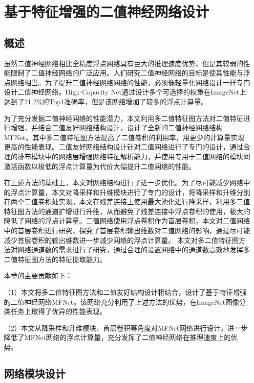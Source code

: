 
\chapter{基于特征增强的二值神经网络设计}

\section{概述}

虽然二值神经网络相比全精度浮点网络具有巨大的推理速度优势，但是其较弱的性能限制了二值神经网络的广泛应用。人们研究二值神经网络的目标是使其性能与浮点网络相当。为了提升二值神经网络网络的性能，必须像轻量化网络设计一样专门设计二值神经网络。High-Capacity Net\cite{expert}通过设计多个可选择的权重在ImageNet上达到了71.2\%的Top1准确率，但是该网络增加了较多的浮点计算量。

为了充分发掘二值神经网络的性能潜力，本文利用多二值特征图方法对二值特征进行增强，并结合二值友好网络结构设计，设计了全新的二值神经网络结构MFNet。其中多二值特征图方法提高了二值卷积的利用率，用更少的计算量实现更高的性能表现。二值友好网络结构设计针对二值网络进行了专门的设计，通过合理的排布模块中的网络层增强网络特征解析能力，并使用专用于二值网络的模块间激活函数以极低的浮点计算量为代价大幅提升二值网络的性能。

在上述方法的基础上，本文对网络结构进行了进一步优化。为了尽可能减少网络中的浮点计算量，本文对降采样和升维模块进行了专门的设计，将降采样和升维分别在两个二值卷积处实现。本文在残差连接上使用最大池化进行降采样，利用多二值特征图方法的通道扩增进行升维，从而避免了残差连接中浮点卷积的使用，极大的降低了网络的浮点计算量。二值网络使用浮点卷积作为首层卷积，本文对二值网络中的首层卷积进行研究，探究了首层卷积输出维数对二值网络的影响，通过尽可能减少首层卷积的输出维数进一步减少网络的浮点计算量。
本文对多二值特征图方法对网络通道数的需求进行了研究，通过合理的设置网络中的通道数高效地发挥多二值特征图方法的特征提取能力。

本章的主要贡献如下：

（1）本文将多二值特征图方法和二值友好结构设计相结合，设计了基于特征增强的二值神经网络MFNet。该网络充分利用了上述方法的优势，在ImageNet图像分类任务上取得了优异的性能表现。

（2）本文从降采样和升维模块、首层卷积等角度对MFNet网络进行设计，进一步降低了MFNet网络的浮点计算量，充分发挥了二值神经网络在推理速度上的优势。

\section{网络模块设计}

